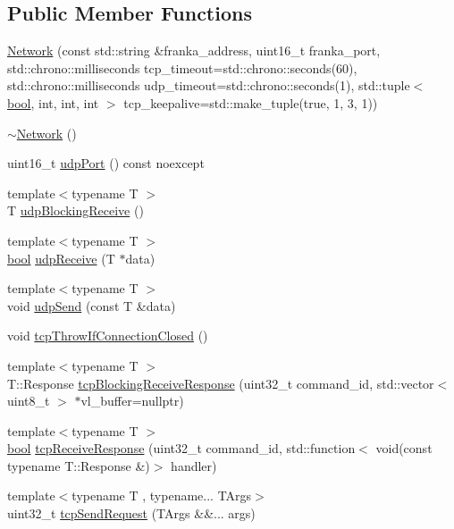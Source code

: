 \subsection*{Public Member Functions}
\begin{DoxyCompactItemize}
\item 
\hyperlink{classfranka_1_1Network_ab4e183198d560b5093dcf2f048596001}{Network} (const std\+::string \&franka\+\_\+address, uint16\+\_\+t franka\+\_\+port, std\+::chrono\+::milliseconds tcp\+\_\+timeout=std\+::chrono\+::seconds(60), std\+::chrono\+::milliseconds udp\+\_\+timeout=std\+::chrono\+::seconds(1), std\+::tuple$<$ \hyperlink{classbool}{bool}, int, int, int $>$ tcp\+\_\+keepalive=std\+::make\+\_\+tuple(true, 1, 3, 1))
\item 
\hyperlink{classfranka_1_1Network_a3f3c01dc53b6016a0bb3070ae539667f}{$\sim$\+Network} ()
\item 
uint16\+\_\+t \hyperlink{classfranka_1_1Network_ac3d85a9e79ef349dda41a6dfb0f0d49e}{udp\+Port} () const noexcept
\item 
{\footnotesize template$<$typename T $>$ }\\T \hyperlink{classfranka_1_1Network_aa6400391cf1485866dc321e6ba3063ad}{udp\+Blocking\+Receive} ()
\item 
{\footnotesize template$<$typename T $>$ }\\\hyperlink{classbool}{bool} \hyperlink{classfranka_1_1Network_a904bdd93b768d83d62c93c273cff7b32}{udp\+Receive} (T $\ast$data)
\item 
{\footnotesize template$<$typename T $>$ }\\void \hyperlink{classfranka_1_1Network_ac5a58083323e337012313b4a3580c2cc}{udp\+Send} (const T \&data)
\item 
void \hyperlink{classfranka_1_1Network_ab1422a98fe11284ec48e1b85ddd8303d}{tcp\+Throw\+If\+Connection\+Closed} ()
\item 
{\footnotesize template$<$typename T $>$ }\\T\+::\+Response \hyperlink{classfranka_1_1Network_ae946c4dc9673902bd3e40a1bef65862a}{tcp\+Blocking\+Receive\+Response} (uint32\+\_\+t command\+\_\+id, std\+::vector$<$ uint8\+\_\+t $>$ $\ast$vl\+\_\+buffer=nullptr)
\item 
{\footnotesize template$<$typename T $>$ }\\\hyperlink{classbool}{bool} \hyperlink{classfranka_1_1Network_a7457dce9d5a6850c29ee9b66da04a749}{tcp\+Receive\+Response} (uint32\+\_\+t command\+\_\+id, std\+::function$<$ void(const typename T\+::\+Response \&)$>$ handler)
\item 
{\footnotesize template$<$typename T , typename... T\+Args$>$ }\\uint32\+\_\+t \hyperlink{classfranka_1_1Network_abcb70ba573d7a6767b205dc6a89183f8}{tcp\+Send\+Request} (T\+Args \&\&... args)
\end{DoxyCompactItemize}
